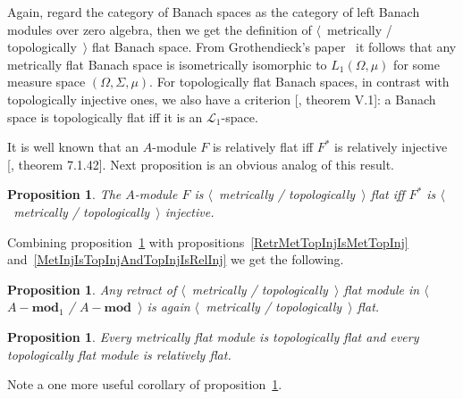 \documentclass[12pt]{article}
\newtheorem{proposition}[theorem]{Proposition}
\begin{document}
Again, regard the category of Banach spaces as the category of left Banach
modules over zero algebra, then we get the definition of $\langle$~metrically /
topologically~$\rangle$ flat Banach space. From Grothendieck's
paper~\cite{GrothMetrProjFlatBanSp} it follows that any metrically flat Banach
space is isometrically isomorphic to $L_1(\Omega,\mu)$ for some measure space
$(\Omega,\Sigma,\mu)$. For topologically flat Banach spaces, in contrast with
topologically injective ones, we also have a criterion
    [\cite{StegRethNucOpL1LInfSp}, theorem V.1]: a Banach space is topologically
flat iff it is an $\mathscr{L}_1$-space.

It is well known that an $A$-module $F$ is relatively flat iff $F^*$ is
relatively injective [\cite{HelBanLocConvAlg}, theorem 7.1.42]. Next proposition
is an obvious analog of this result.

\begin{proposition}\label{MetTopFlatCharac} The $A$-module $F$ is
    $\langle$~metrically / topologically~$\rangle$ flat iff $F^*$ is
    $\langle$~metrically / topologically~$\rangle$ injective.
\end{proposition}

Combining proposition~\ref{MetTopFlatCharac} with
propositions~\ref{RetrMetTopInjIsMetTopInj}
and~\ref{MetInjIsTopInjAndTopInjIsRelInj} we get the following.

\begin{proposition}\label{RetrMetTopFlatIsMetTopFlat} Any retract of
    $\langle$~metrically / topologically~$\rangle$ flat module in
    $\langle$~$A-\mathbf{mod}_1$ / $A-\mathbf{mod}$~$\rangle$ is again 
    $\langle$~metrically / topologically~$\rangle$ flat.
\end{proposition}

\begin{proposition}\label{MetFlatIsTopFlatAndTopFlatIsRelFlat} Every metrically
    flat module is topologically flat and every topologically flat module is
    relatively flat.
\end{proposition}

Note a one more useful corollary of proposition~\ref{MetTopFlatCharac}.
\end{document}
